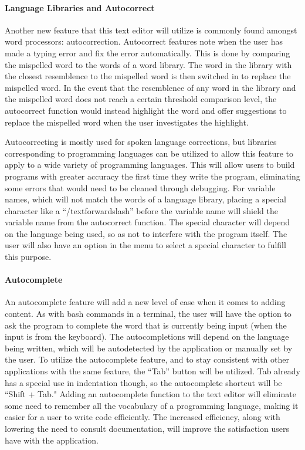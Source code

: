\documentclass[11pt, oneside]{article}
\begin{document}
\paragraph{Language Libraries and Autocorrect}
Another new feature that this text editor will utilize is commonly found amongst word processors: autocorrection. Autocorrect features note when the user has made a typing error and fix the error automatically. This is done by comparing the mispelled word to the words of a word library. The word in the library with the closest resemblence to the mispelled word is then switched in to replace the mispelled word. In the event that the resemblence of any word in the library and the mispelled word does not reach a certain threshold comparison level, the autocorrect function would instead highlight the word and offer suggestions to replace the mispelled word when the user investigates the highlight. 

Autocorrecting is mostly used for spoken language corrections, but libraries corresponding to programming languages can be utilized to allow this feature to apply to a wide variety of programming languages. This will allow users to build programs with greater accuracy the first time they write the program, eliminating some errors that would need to be cleaned through debugging. For variable names, which will not match the words of a language library, placing a special character like a ``/textforwardslash'' before the variable name will shield the variable name from the autocorrect function. The special character will depend on the language being used, so as not to interfere with the program itself. The user will also have an option in the menu to select a special character to fulfill this purpose.

\paragraph{Autocomplete}
An autocomplete feature will add a new level of ease when it comes to adding content. As with bash commands in a terminal, the user will have the option to ask the program to complete the word that is currently being input (when the input is from the keyboard). The autocompletions will depend on the language being written, which will be autodetected by the application or manually set by the user. To utilize the autocomplete feature, and to stay consistent with other applications with the same feature, the ``Tab'' button will be utilized. Tab already has a special use in indentation though, so the autocomplete shortcut will be ``Shift + Tab." Adding an autocomplete function to the text editor will eliminate some need to remember all the vocabulary of a programming language, making it easier for a user to write code efficiently. The increased efficiency, along with lowering the need to consult documentation, will improve the satisfaction users have with the application. 
\end{document}
